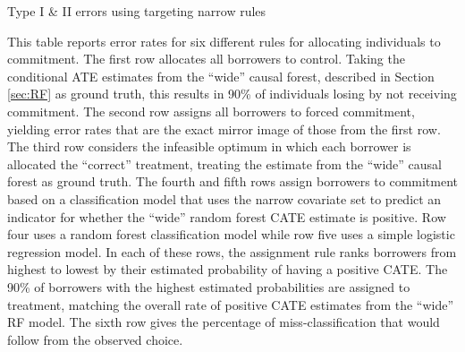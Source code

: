 \documentclass[oneside,11pt]{article}
\begin{document}
\begin{table}[H]
\caption{Type I \& II errors using targeting narrow rules}
\label{hit_miss_rule}
\begin{center}
\resizebox{0.95\textwidth}{!}{
\small{}
}
\end{center}
\scriptsize This table reports error rates for six different rules for allocating individuals to commitment. The first row allocates all borrowers to control. Taking the conditional ATE estimates from the ``wide'' causal forest, described in Section \ref{sec:RF} as ground truth, this results in 90\% of individuals losing by not receiving commitment. The second row assigns all borrowers to forced commitment, yielding error rates that are the exact mirror image of those from the first row.  The third row considers the infeasible optimum in which each borrower is allocated the ``correct'' treatment, treating the estimate from the ``wide'' causal forest as ground truth. The fourth and fifth rows assign borrowers to commitment based on a classification model that uses the narrow covariate set to predict an indicator for whether the ``wide'' random forest CATE estimate is positive. Row four uses a random forest classification model while row five uses a simple logistic regression model. In each of these rows, the assignment rule ranks borrowers from highest to lowest by their estimated probability of having a positive CATE. The 90\% of borrowers with the highest estimated probabilities are assigned to treatment, matching the overall rate of positive CATE estimates from the ``wide'' RF model. The sixth row gives the percentage of miss-classification that would follow from the observed choice. 

\end{table} 

\vspace{.3in}
\end{document}
